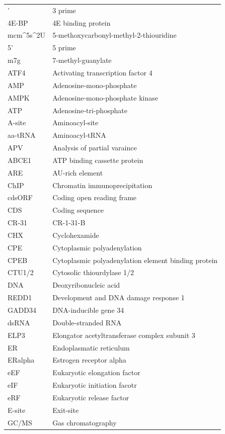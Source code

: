 \documentclass[
  12pt,
  openany]{book}
\begin{document}
\begin{longtable}{ll}
\endfoot
\bottomrule
\endlastfoot
3' & 3 prime\\
4E-BP & 4E binding protein\\
mcm\textasciicircum{}5s\textasciicircum{}2U & 5-methoxycarbonyl-methyl-2-thiouridine\\
5' & 5 prime\\
m7g & 7-methyl-guanylate\\
\addlinespace
ATF4 & Activating transcription factor 4\\
AMP & Adenosine-mono-phosphate\\
AMPK & Adenosine-mono-phosphate
kinase\\
ATP & Adenosine-tri-phosphate\\
A-site & Aminoacyl-site\\
\addlinespace
aa-tRNA & Aminoacyl-tRNA\\
APV & Analysis of partial varaince\\
ABCE1 & ATP binding cassette protein\\
ARE & AU-rich element\\
ChIP & Chromatin immunoprecipitation\\
\addlinespace
cdsORF & Coding open reading frame\\
CDS & Coding sequence\\
CR-31 & CR-1-31-B\\
CHX & Cyclohexamide\\
CPE & Cytoplasmic polyadenylation\\
\addlinespace
CPEB & Cytoplasmic polyadenylation element binding protein\\
CTU1/2 & Cytosolic thiourdylase 1/2\\
DNA & Deoxyribonucleic acid\\
REDD1 & Development and
DNA damage response 1\\
GADD34 & DNA-inducible gene 34\\
\addlinespace
dsRNA & Double-stranded RNA\\
ELP3 & Elongator acetyltransferase complex subunit 3\\
ER & Endoplasmatic reticulum\\
ERalpha & Estrogen receptor alpha\\
eEF & Eukaryotic elongation factor\\
\addlinespace
eIF & Eukaryotic initiation facotr\\
eRF & Eukaryotic release factor\\
E-site & Exit-site\\
GC/MS & Gas chromatography

\end{longtable}
\end{document}

